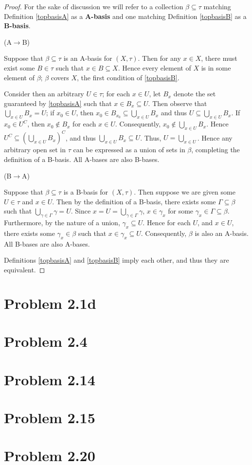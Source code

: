 \documentclass{article}
\theoremstyle{definition}
\newcommand{\p}[1]{\left(#1\right)}
\begin{document}
\begin{proof}
For the sake of discussion we will refer to a collection $\beta \subseteq\tau$ 
matching Definition \ref{topbasisA} as a \textbf{A-basis} 
and one matching Definition \ref{topbasisB} as a \textbf{B-basis}.

(A$\to$B)

Suppose that $\beta\subseteq\tau$ is an A-basis for $(X,\tau)$. Then for any $x \in X$, there must
exist some $B \in \tau$ such that $x \in B \subseteq X$. Hence every element of $X$ is in some
element of $\beta$; $\beta$ covers $X$, the first condition of \ref{topbasisB}. 

Consider then an arbitrary $U \in \tau$; for each $x \in U$, let $B_x$ denote the set guaranteed 
by \ref{topbasisA} such that $x \in B_x \subseteq U$. Then observe that 
$\bigcup_{x\in U} B_x = U$; if $x_0 \in U$, then $x_0 \in B_{x_0} \subseteq \bigcup_{x\in U} B_x$
and thus $U \subseteq \bigcup_{x\in U} B_x$. If $x_0 \in U^C$, then $x_0 \not\in B_x$ for each
$x\in U$. Consequently, $x_0 \not\in\bigcup_{x\in U} B_x$. Hence 
$U^C \subseteq \p{\bigcup_{x\in U} B_x}^C$, and thus $\bigcup_{x\in U} B_x \subseteq U$. Thus,
$U = \bigcup_{x\in U}$. Hence any arbitrary open set in $\tau$ can be expressed as a union of sets
in $\beta$, completing the definition of a B-basis. All A-bases are also B-bases.

(B$\to$A)

Suppose that $\beta\subseteq\tau$ is a B-basis for $(X,\tau)$. Then suppose we are given some 
$U \in \tau$ and $x \in U$. Then by the definition of a B-basis, there exists some 
$\Gamma \subseteq \beta$ such that $\bigcup_{\gamma \in \Gamma} \gamma = U$. Since
$x = U = \bigcup_{\gamma\in\Gamma} \gamma$, $x \in \gamma_x$ for some 
$\gamma_x \in \Gamma \subseteq \beta$. 
Furthermore, by the nature of a union, $\gamma_x \subseteq U$. 
Hence for each $U$, and $x \in U$, there exists some 
$\gamma_x \in \beta$ such that $x \in \gamma_x \subseteq U$. Consequently, $\beta$ is also an
A-basis. All B-bases are also A-bases.

Definitions \ref{topbasisA} and \ref{topbasisB} imply each other, and thus they are equivalent.
\end{proof}

\section{Problem 2.1d}
\section{Problem 2.4}
\section{Problem 2.14}
\section{Problem 2.15}
\section{Problem 2.20}
\end{document}
